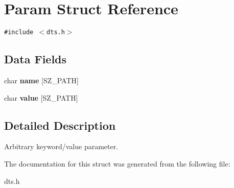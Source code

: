 \hypertarget{structParam}{
\section{Param Struct Reference}
\label{structParam}
}
{\tt \#include $<$dts.h$>$}

\subsection*{Data Fields}
\begin{CompactItemize}
\item 
\hypertarget{structParam_595ff06e9a5330d098dbb7b720280529}{
char \textbf{name} \mbox{[}SZ\_\-PATH\mbox{]}}
\label{structParam_595ff06e9a5330d098dbb7b720280529}

\item 
\hypertarget{structParam_9bd500f196928098e88ffef353f34f2a}{
char \textbf{value} \mbox{[}SZ\_\-PATH\mbox{]}}
\label{structParam_9bd500f196928098e88ffef353f34f2a}

\end{CompactItemize}


\subsection{Detailed Description}
Arbitrary keyword/value parameter. 

The documentation for this struct was generated from the following file:\begin{CompactItemize}
\item 
dts.h\end{CompactItemize}
